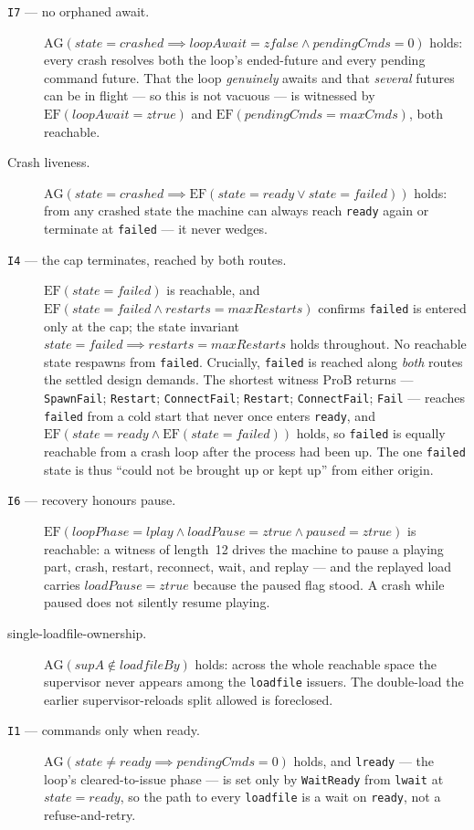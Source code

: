 \documentclass[a4paper,10pt,fleqn]{article}
\begin{document}
\begin{description}
  \item[\texttt{I7} --- no orphaned await.] $\mathrm{AG}(state = crashed
    \implies loopAwait = zfalse \land pendingCmds = 0)$ holds: every crash
    resolves both the loop's ended-future and every pending command future.
    That the loop \emph{genuinely} awaits and that \emph{several} futures can be
    in flight --- so this is not vacuous --- is witnessed by
    $\mathrm{EF}(loopAwait = ztrue)$ and $\mathrm{EF}(pendingCmds = maxCmds)$,
    both reachable.
  \item[Crash liveness.] $\mathrm{AG}(state = crashed \implies \mathrm{EF}(state
    = ready \lor state = failed))$ holds: from any crashed state the machine can
    always reach \texttt{ready} again or terminate at \texttt{failed} --- it
    never wedges.
  \item[\texttt{I4} --- the cap terminates, reached by both routes.]
    $\mathrm{EF}(state = failed)$ is reachable, and $\mathrm{EF}(state = failed
    \land restarts = maxRestarts)$ confirms \texttt{failed} is entered only at
    the cap; the state invariant $state = failed \implies restarts =
    maxRestarts$ holds throughout. No reachable state respawns from
    \texttt{failed}. Crucially, \texttt{failed} is reached along \emph{both}
    routes the settled design demands. The shortest witness ProB returns ---
    \texttt{SpawnFail}; \texttt{Restart}; \texttt{ConnectFail}; \texttt{Restart};
    \texttt{ConnectFail}; \texttt{Fail} --- reaches \texttt{failed} from a cold
    start that never once enters \texttt{ready}, and $\mathrm{EF}(state = ready
    \land \mathrm{EF}(state = failed))$ holds, so \texttt{failed} is equally
    reachable from a crash loop after the process had been up. The one
    \texttt{failed} state is thus ``could not be brought up or kept up'' from
    either origin.
  \item[\texttt{I6} --- recovery honours pause.] $\mathrm{EF}(loopPhase = lplay
    \land loadPause = ztrue \land paused = ztrue)$ is reachable: a witness of
    length~12 drives the machine to pause a playing part, crash, restart,
    reconnect, wait, and replay --- and the replayed load carries
    $loadPause = ztrue$ because the paused flag stood. A crash while paused
    does not silently resume playing.
  \item[single-loadfile-ownership.] $\mathrm{AG}(supA \notin loadfileBy)$ holds:
    across the whole reachable space the supervisor never appears among the
    \texttt{loadfile} issuers. The double-load the earlier supervisor-reloads
    split allowed is foreclosed.
  \item[\texttt{I1} --- commands only when ready.] $\mathrm{AG}(state \neq ready
    \implies pendingCmds = 0)$ holds, and \texttt{lready} --- the loop's
    cleared-to-issue phase --- is set only by \texttt{WaitReady} from
    \texttt{lwait} at $state = ready$, so the path to every \texttt{loadfile} is
    a wait on \texttt{ready}, not a refuse-and-retry.
\end{description}
\end{document}
